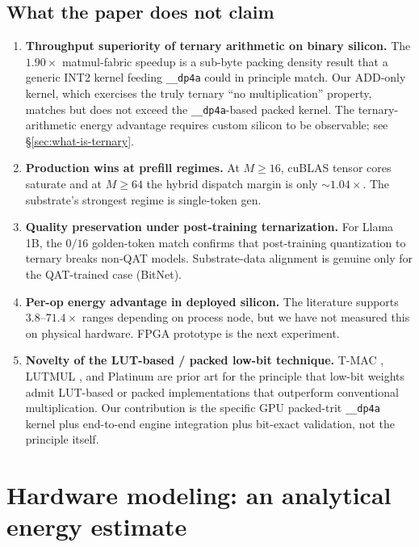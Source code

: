 \documentclass{article}
\begin{document}
\subsection{What the paper does not claim}

\begin{enumerate}
  \item \textbf{Throughput superiority of ternary arithmetic on binary
    silicon.} The $1.90\times$ matmul-fabric speedup is a sub-byte
    packing density result that a generic {INT2} kernel feeding
    \texttt{\_\_dp4a} could in principle match. Our {ADD}-only kernel,
    which exercises the truly ternary ``no multiplication'' property,
    matches but does not exceed the \texttt{\_\_dp4a}-based packed
    kernel. The ternary-arithmetic energy advantage requires custom
    silicon to be observable; see \S\ref{sec:what-is-ternary}.
  \item \textbf{Production wins at prefill regimes.} At $M \geq 16$,
    cuBLAS tensor cores saturate and at $M \geq 64$ the hybrid dispatch
    margin is only $\sim 1.04\times$. The substrate's strongest regime
    is single-token gen.
  \item \textbf{Quality preservation under post-training
    ternarization.} For Llama 1B, the $0/16$ golden-token match
    confirms that post-training quantization to ternary breaks
    non-{QAT} models. Substrate-data alignment is genuine only for the
    {QAT}-trained case (BitNet).
  \item \textbf{Per-op energy advantage in deployed silicon.}
    The literature \citep{horowitz-energy-2014,cutie-2020,cuevas-formal-2026}
    supports $3.8$--$71.4\times$ ranges depending on process node, but
    we have not measured this on physical hardware. {FPGA} prototype
    is the next experiment.
  \item \textbf{Novelty of the {LUT}-based / packed low-bit
    technique.} {T-MAC} \citep{tmac-eurosys-2025}, {LUTMUL}
    \citep{lutmul-aspdac-2025}, and {Platinum} \citep{platinum-2025}
    are prior art for the principle that low-bit weights admit
    {LUT}-based or packed implementations that outperform conventional
    multiplication. Our contribution is the specific {GPU} packed-trit
    \texttt{\_\_dp4a} kernel plus end-to-end engine integration plus
    bit-exact validation, not the principle itself.
\end{enumerate}

\section{Hardware modeling: an analytical energy estimate}
\label{sec:hwmodel}
\end{document}
